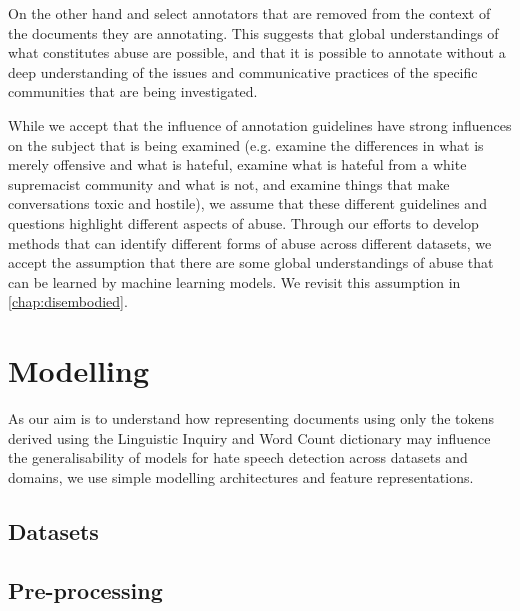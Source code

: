 On the other hand \citet{Garcia:2019} and \citet{Davidson:2017} select annotators that are removed from the context of the documents they are annotating. This suggests that global understandings of what constitutes abuse are possible, and that it is possible to annotate without a deep understanding of the issues and communicative practices of the specific communities that are being investigated.

While we accept that the influence of annotation guidelines have strong influences on the subject that is being examined (e.g. \citet{Davidson:2017} examine the differences in what is merely offensive and what is hateful, \citet{Garcia:2019} examine what is hateful from a white supremacist community and what is not, and \citet{Wulczyn:2017} examine things that make conversations toxic and hostile), we assume that these different guidelines and questions highlight different aspects of abuse. Through our efforts to develop methods that can identify different forms of abuse across different datasets, we accept the assumption that there are some global understandings of abuse that can be learned by machine learning models. We revisit this assumption in \autoref{chap:disembodied}.

\section{Modelling}
As our aim is to understand how representing documents using only the tokens derived using the Linguistic Inquiry and Word Count dictionary may influence the generalisability of models for hate speech detection across datasets and domains, we use simple modelling architectures and feature representations.

\subsection{Datasets}

\subsection{Pre-processing}


\begin{table}
  \centering
  \caption{Word token and BPE representation.}
  \label{tab:bpe_tok}
\end{table}

